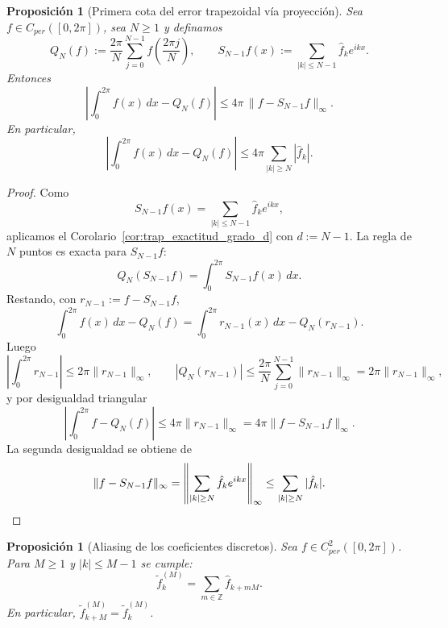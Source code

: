 \documentclass[a4paper,11pt]{report}
\newtheorem{proposition}[theorem]{Proposición}
\begin{document}
\begin{proposition}[Primera cota del error trapezoidal vía proyección]\label{prop:trapecio_cota_proyeccion}
Sea $f\in C_{per}([0,2\pi])$, sea $N\ge 1$ y definamos
\[
Q_N(f):=\frac{2\pi}{N}\sum_{j=0}^{N-1}f\!\left(\frac{2\pi j}{N}\right),
\qquad
S_{N-1}f(x):=\sum_{|k|\le N-1}\hat f_k e^{ikx}.
\]
Entonces
\[
\left|\int_0^{2\pi} f(x)\,dx-Q_N(f)\right|
\le 4\pi\,\|f-S_{N-1}f\|_\infty.
\]
En particular,
\[
\left|\int_0^{2\pi} f(x)\,dx-Q_N(f)\right|
\le 4\pi\sum_{|k|\ge N}|\hat f_k|.
\]
\end{proposition}

\begin{proof}
Como
\[
S_{N-1}f(x)=\sum_{|k|\le N-1}\hat f_k e^{ikx},
\]
aplicamos el Corolario~\ref{cor:trap_exactitud_grado_d} con $d:=N-1$. La regla de $N$ puntos es exacta para $S_{N-1}f$:
\[
Q_N(S_{N-1}f)=\int_0^{2\pi}S_{N-1}f(x)\,dx.
\]
Restando, con $r_{N-1}:=f-S_{N-1}f$,
\[
\int_0^{2\pi} f(x)\,dx-Q_N(f)
=\int_0^{2\pi} r_{N-1}(x)\,dx-Q_N(r_{N-1}).
\]
Luego
\[
\left|\int_0^{2\pi} r_{N-1}\right|\le 2\pi\|r_{N-1}\|_\infty,
\qquad
|Q_N(r_{N-1})|\le \frac{2\pi}{N}\sum_{j=0}^{N-1}\|r_{N-1}\|_\infty=2\pi\|r_{N-1}\|_\infty,
\]
y por desigualdad triangular
\[
\left|\int_0^{2\pi} f-Q_N(f)\right|\le 4\pi\|r_{N-1}\|_\infty=4\pi\|f-S_{N-1}f\|_\infty.
\]
La segunda desigualdad se obtiene de
\[
\|f-S_{N-1}f\|_\infty=\left\|\sum_{|k|\ge N}\hat f_k e^{ikx}\right\|_\infty
\le \sum_{|k|\ge N}|\hat f_k|.\qedhere
\]
\end{proof}

\begin{proposition}[Aliasing de los coeficientes discretos]\label{prop:aliasing_coef_discretos}
Sea $f\in C^2_{per}([0,2\pi])$. Para $M\ge 1$ y $|k|\le M-1$ se cumple:
\begin{equation}\label{aliasing_fourier_trap}
\tilde f_k^{(M)} = \sum_{m\in\mathbb Z}\hat f_{k+mM}.
\end{equation}
En particular, $\tilde f_{k+M}^{(M)}=\tilde f_k^{(M)}$.
\end{proposition}
\end{document}

